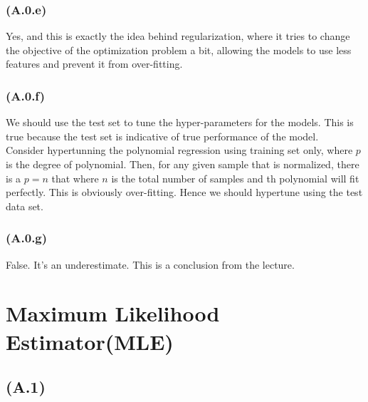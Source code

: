 \documentclass[]{article}
\begin{document}
        \subsubsection*{(A.0.e)}
            Yes, and this is exactly the idea behind regularization, where it tries to change the objective of the optimization problem a bit, allowing the models to use less features and prevent it from over-fitting. 
        \subsubsection*{(A.0.f)}
            We should use the test set to tune the hyper-parameters for the models. This is true because the test set is indicative of true performance of the model. 
            \\
            Consider hypertunning the polynomial regression using training set only, where $p$ is the degree of polynomial. Then, for any given sample that is normalized, there is a $p = n$ that where $n$ is the total number of samples and th polynomial will fit perfectly. This is obviously over-fitting. Hence we should hypertune using the test data set. 
        \subsubsection*{(A.0.g)}
            False. It's an underestimate. This is a conclusion from the lecture. 

\section*{Maximum Likelihood Estimator(MLE)}
    \subsection*{(A.1)}
\end{document}
